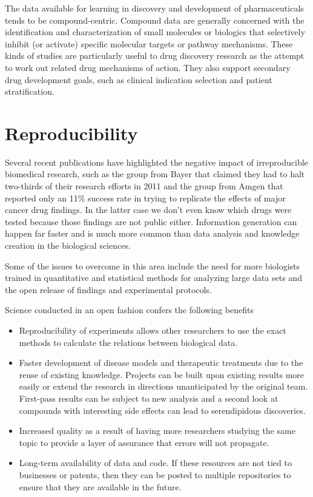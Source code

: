 The data available for learning in discovery and development of pharmaceuticals tends to be compound-centric. Compound data are generally concerned with the identification and characterization of small molecules or biologics that selectively inhibit (or activate) specific molecular targets or pathway mechanisms. These kinds of studies are particularly useful to drug discovery research as the attempt to work out related drug mechanisms of action. They also support secondary drug development goals, such as clinical indication selection and patient stratification. \cite{Berg2014}


\section{Reproducibility}

Several recent publications have highlighted the negative impact of irreproducible biomedical research, such as the group from Bayer that claimed they had to halt two-thirds of their research efforts in 2011 \cite{Prinz2011} and the group from Amgen that reported only an 11\% success rate in trying to replicate the effects of major cancer drug findings. \cite{Begley2012} In the latter case we don't even know which drugs were tested because those findings are not public either. Information generation can happen far faster and is much more common than data analysis and knowledge creation in the biological sciences.

Some of the issues to overcome in this area include the need for more biologists trained in quantitative and statistical methods for analyzing large data sets and the open release of findings and experimental protocols. 

Science conducted in an open fashion confers the following benefits

\begin{itemize}

\item Reproducibility of experiments allows other researchers to use the exact methods to calculate the relations between biological data.

\item Faster development of disease models and therapeutic treatments due to the reuse of existing knowledge. Projects can be built upon existing results more easily or extend the research in directions unanticipated by the original team. First-pass results can be subject to new analysis and a second look at compounds with interesting side effects can lead to serendipidous discoveries.

\item Increased quality as a result of having more researchers studying the same topic to provide a layer of assurance that errors will not propagate.

\item Long-term availability of data and code. If these resources are not tied to businesses or patents, then they can be posted to multiple repositories to ensure that they are available in the future.
\cite{Prlic2012}

\end{itemize}

